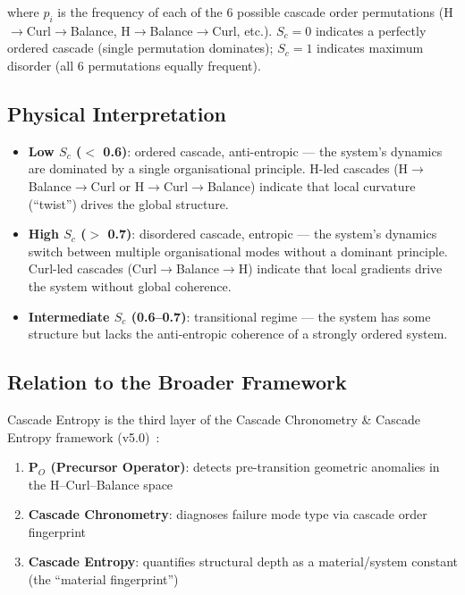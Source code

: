 \documentclass[12pt,a4paper]{article}
\begin{document}
where $p_i$ is the frequency of each of the 6 possible cascade order
permutations (H$\rightarrow$Curl$\rightarrow$Balance,
H$\rightarrow$Balance$\rightarrow$Curl, etc.). $S_c = 0$ indicates a
perfectly ordered cascade (single permutation dominates); $S_c = 1$
indicates maximum disorder (all 6 permutations equally frequent).

\subsection{Physical Interpretation}

\begin{itemize}[leftmargin=*]
  \item \textbf{Low $S_c$ ($<$ 0.6)}: ordered cascade, anti-entropic ---
    the system's dynamics are dominated by a single organisational
    principle. H-led cascades (H$\rightarrow$Balance$\rightarrow$Curl or
    H$\rightarrow$Curl$\rightarrow$Balance) indicate that local curvature
    (``twist'') drives the global structure.
  \item \textbf{High $S_c$ ($>$ 0.7)}: disordered cascade, entropic ---
    the system's dynamics switch between multiple organisational modes
    without a dominant principle. Curl-led cascades
    (Curl$\rightarrow$Balance$\rightarrow$H) indicate that local gradients
    drive the system without global coherence.
  \item \textbf{Intermediate $S_c$ (0.6--0.7)}: transitional regime ---
    the system has some structure but lacks the anti-entropic coherence of
    a strongly ordered system.
\end{itemize}

\subsection{Relation to the Broader Framework}

Cascade Entropy is the third layer of the Cascade Chronometry \& Cascade
Entropy framework (v5.0)~\cite{cascade_entropy_v5}:

\begin{enumerate}[leftmargin=*]
  \item \textbf{P$_O$ (Precursor Operator)}: detects pre-transition
    geometric anomalies in the H--Curl--Balance space
  \item \textbf{Cascade Chronometry}: diagnoses failure mode type via
    cascade order fingerprint
  \item \textbf{Cascade Entropy}: quantifies structural depth as a
    material/system constant (the ``material fingerprint'')
\end{enumerate}
\end{document}
